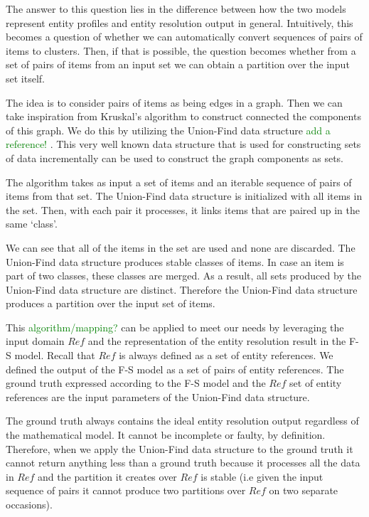 \documentclass[journal]{IEEEtran}
\begin{document}
    The answer to this question lies in the difference between how the two
    models represent entity profiles and entity resolution output in general.
    Intuitively, this becomes a question of whether we can automatically convert
    sequences of pairs of items to clusters.
    Then, if that is possible, the question becomes whether from a set of pairs
    of items from an input set we can obtain a partition over the input set
    itself.

    The idea is to consider pairs of items as being edges in a graph.
    Then we can take inspiration from Kruskal's algorithm to construct connected
    the components of this graph.
    We do this by utilizing the Union-Find data structure 
    \textcolor{green}{add a reference!}
    .
    This very well known data structure that is used for constructing sets of
    data incrementally can be used to construct the graph components as sets.

    The algorithm takes as input a set of items and an iterable sequence of
    pairs of items from that set.
    The Union-Find data structure is initialized with all items in the set.
    Then, with each pair it processes, it links items that are paired up in
    the same `class'.

    We can see that all of the items in the set are used and none are discarded.
    The Union-Find data structure produces stable classes of items.
    In case an item is part of two classes, these classes are merged.
    As a result, all sets produced by the Union-Find data structure are
    distinct.
    Therefore the Union-Find data structure produces a partition over the input
    set of items.

    This 
    \textcolor{green}{algorithm/mapping?} 
    can be applied to meet our needs by leveraging the input domain $Ref$
    and the representation of the entity resolution result in the F-S model.
    Recall that $Ref$ is always defined as a set of entity references.
    We defined the output of the F-S model as a set of pairs of entity
    references.
    The ground truth expressed according to the F-S model and the $Ref$ set of
    entity references are the input parameters of the Union-Find data structure.

    The ground truth always contains the ideal entity resolution output
    regardless of the mathematical model.
    It cannot be incomplete or faulty, by definition.
    Therefore, when we apply the Union-Find data structure to the ground truth
    it cannot return anything less than a ground truth because it processes all
    the data in $Ref$ and the partition it creates over $Ref$ is stable (i.e
    given the input sequence of pairs it cannot produce two partitions over $Ref$
    on two separate occasions).
\end{document}
